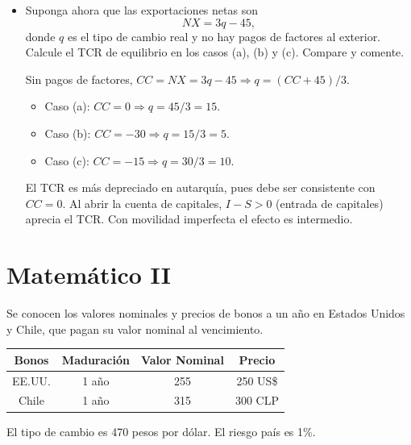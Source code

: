 \documentclass[a4paper]{article}
\begin{document}
\begin{itemize}
    \item[d)] Suponga ahora que las exportaciones netas son
    \[
        NX = 3q - 45,
    \]
    donde $q$ es el tipo de cambio real y no hay pagos de factores al exterior. Calcule el TCR de equilibrio en los casos (a), (b) y (c). Compare y comente.

    \begin{solution}
        Sin pagos de factores, \( CC = NX = 3q - 45 \Rightarrow q = (CC + 45)/3 \).
        \begin{itemize}
            \item Caso (a): \( CC = 0 \Rightarrow q = 45/3 = 15 \).
            \item Caso (b): \( CC = -30 \Rightarrow q = 15/3 = 5 \).
            \item Caso (c): \( CC = -15 \Rightarrow q = 30/3 = 10 \).
        \end{itemize}
        El TCR es m\'as depreciado en autarqu\'ia, pues debe ser consistente con \( CC = 0 \). Al abrir la cuenta de capitales, \( I - S > 0 \) (entrada de capitales) aprecia el TCR. Con movilidad imperfecta el efecto es intermedio.
    \end{solution}
\end{itemize}

\section*{Matem\'atico II}

Se conocen los valores nominales y precios de bonos a un a\~no en Estados Unidos y Chile, que pagan su valor nominal al vencimiento.

\begin{center}
\begin{tabular}{|c|c|c|c|}
\hline
\textbf{Bonos} & \textbf{Maduraci\'on} & \textbf{Valor Nominal} & \textbf{Precio} \\
\hline
EE.UU. & 1 a\~no & 255 & 250 US\$ \\
Chile & 1 a\~no & 315 & 300 CLP \\
\hline
\end{tabular}
\end{center}

El tipo de cambio es 470 pesos por d\'olar. El riesgo pa\'is es 1\%.
\end{document}
